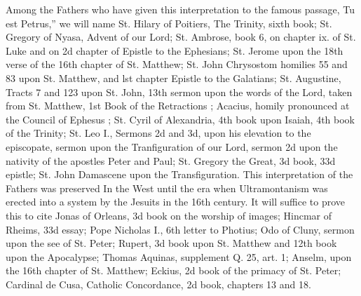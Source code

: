 Among the Fathers who have given this interpretation to the famous passage, Tu est Petrus,” we will name St. Hilary of Poitiers, The Trinity, sixth book; St. Gregory of Nyasa, Advent of our Lord; St. Ambrose, book 6, on chapter ix. of St. Luke and on 2d chapter of Epistle to the Ephesians; St. Jerome upon the 18th verse of the 16th chapter of St. Matthew; St. John Chrysostom homilies 55 and 83 upon St. Matthew, and lst chapter Epistle to the Galatians; St. Augustine, Tracts 7 and 123 upon St. John, 13th sermon upon the words of the Lord, taken from St. Matthew, 1st Book of the Retractions ; Acacius, homily pronounced at the Council of Ephesus ; St. Cyril of Alexandria, 4th book upon Isaiah, 4th book of the Trinity; St. Leo I., Sermons 2d and 3d, upon his elevation to the episcopate, sermon upon the Tranfiguration of our Lord, sermon 2d upon the nativity of the apostles Peter and Paul; St. Gregory the Great, 3d book, 33d epistle; St. John Damascene upon the Transfiguration. This interpretation of the Fathers was preserved In the West until the era when Ultramontanism was erected into a system by the Jesuits in the 16th century. It will suffice to prove this to cite Jonas of Orleans, 3d book on the worship of images; Hincmar of Rheims, 33d essay; Pope Nicholas I., 6th letter to Photius; Odo of Cluny, sermon upon the see of St. Peter; Rupert, 3d book upon St. Matthew and 12th book upon the Apocalypse; Thomas Aquinas, supplement Q. 25, art. 1; Anselm, upon the 16th chapter of St. Matthew; Eckius, 2d book of the primacy of St. Peter; Cardinal de Cusa, Catholic Concordance, 2d book, chapters 13 and 18.

